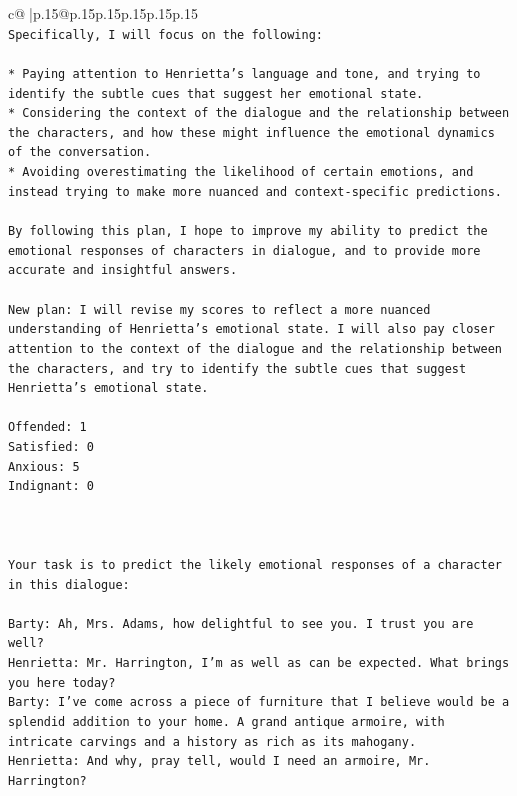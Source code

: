 \documentclass{article}
\begin{document}
{\begin{supertabular}{c@{$\;$}|p{.15\linewidth}@{}p{.15\linewidth}p{.15\linewidth}p{.15\linewidth}p{.15\linewidth}p{.15\linewidth}}
{{{\\ 
\texttt{Specifically, I will focus on the following:} \\
\\ 
\texttt{* Paying attention to Henrietta's language and tone, and trying to identify the subtle cues that suggest her emotional state.} \\
\texttt{* Considering the context of the dialogue and the relationship between the characters, and how these might influence the emotional dynamics of the conversation.} \\
\texttt{* Avoiding overestimating the likelihood of certain emotions, and instead trying to make more nuanced and context{-}specific predictions.} \\
\\ 
\texttt{By following this plan, I hope to improve my ability to predict the emotional responses of characters in dialogue, and to provide more accurate and insightful answers.} \\
\\ 
\texttt{New plan: I will revise my scores to reflect a more nuanced understanding of Henrietta's emotional state. I will also pay closer attention to the context of the dialogue and the relationship between the characters, and try to identify the subtle cues that suggest Henrietta's emotional state.} \\
\\ 
\texttt{Offended: 1} \\
\texttt{Satisfied: 0} \\
\texttt{Anxious: 5} \\
\texttt{Indignant: 0} \\
\\ 
\\ 
\\ 
\texttt{Your task is to predict the likely emotional responses of a character in this dialogue:} \\
\\ 
\texttt{Barty: Ah, Mrs. Adams, how delightful to see you. I trust you are well?} \\
\texttt{Henrietta: Mr. Harrington, I'm as well as can be expected. What brings you here today?} \\
\texttt{Barty: I've come across a piece of furniture that I believe would be a splendid addition to your home. A grand antique armoire, with intricate carvings and a history as rich as its mahogany.} \\
\texttt{Henrietta: And why, pray tell, would I need an armoire, Mr. Harrington?} \\
}}}
\end{supertabular}}
\end{document}
